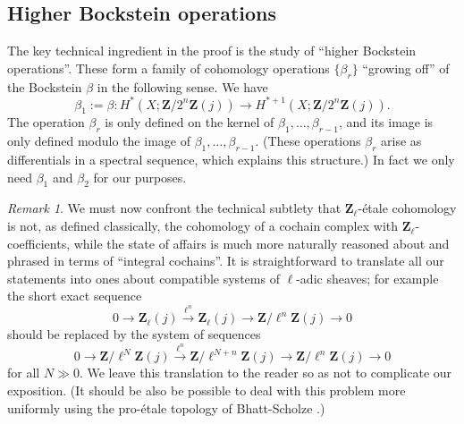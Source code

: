 \documentclass[10pt, reqno]{amsart}
\numberwithin{equation}{subsection}
\newcommand{\Z}{\mathbf{Z}}
\newcommand{\co}{\colon}
\DeclareMathOperator{\et}{\acute{e}t}
\theoremstyle{remark}
\newtheorem{remark}[thm]{Remark}
\begin{document}
\subsection{Higher Bockstein operations}\label{subsec: higher bockstein}



The key technical ingredient in the proof is the study of ``higher Bockstein operations''. These form a family of cohomology operations $\{\beta_r\}$ ``growing off'' of the Bockstein $\beta$ in the following sense. We have
\[
\beta_1 := \beta \co H^*_{\et}(X; \Z/2^n\Z(j)) \rightarrow H^{*+1}_{\et}(X; \Z/2^n\Z(j)).
\]
The operation $\beta_r$ is only defined on the kernel of $\beta_1, \ldots, \beta_{r-1}$, and its image is only defined modulo the image of $\beta_1, \ldots, \beta_{r-1}$. (These operations $\beta_r$ arise as differentials in a spectral sequence, which explains this structure.) In fact we only need $\beta_1$ and $\beta_2$ for our purposes.


\begin{remark}
We must now confront the technical subtlety that $\Z_{\ell}$-\'{e}tale cohomology is not, as defined classically, the cohomology of a cochain complex with $\Z_{\ell}$-coefficients, while the state of affairs is much more naturally reasoned about and phrased in terms of ``integral cochains''. It is straightforward to translate all our statements into ones about compatible systems of $\ell$-adic sheaves; for example the short exact sequence 
\[
0 \rightarrow \Z_\ell(j) \xrightarrow{\ell^n}	 \Z_{\ell}(j)  \rightarrow \Z/\ell^n \Z(j) \rightarrow 0
\]
should be replaced by the system of sequences
\[
0 \rightarrow \Z/\ell^N \Z(j) \xrightarrow{\ell^n}	 \Z/\ell^{N+n}\Z(j)  \rightarrow \Z/\ell^n \Z(j) \rightarrow 0
\]
for all $N \gg 0$. We leave this translation to the reader so as not to complicate our exposition. (It should be also be possible to deal with this problem more uniformly using the pro-\'{e}tale topology of Bhatt-Scholze \cite{BS15}.) 
\end{remark}
\end{document}
